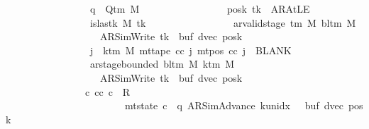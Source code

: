 \begin{isabellebody}
\ \ \ \ \ \ \ \ \ \ \ \ \ \ \ \ \ q\ {\isasymin}\ Q{\isacharunderscore}{\kern0pt}tm\ M{\isacharsemicolon}{\kern0pt}\isanewline
\ \ \ \ \ \ \ \ \ \ \ \ \ \ \ \ \ posk\ tk\ {\isacharequal}{\kern0pt}\ AR{\isacharunderscore}{\kern0pt}AtLE{\isacharsemicolon}{\kern0pt}\isanewline
\ \ \ \ \ \ \ \ \ \ \ \ \ \ \ \ \ is{\isacharunderscore}{\kern0pt}last{\isacharunderscore}{\kern0pt}k\ M\ tk{\isacharsemicolon}{\kern0pt}\isanewline
\ \ \ \ \ \ \ \ \ \ \ \ \ \ \ \ \ ar{\isacharunderscore}{\kern0pt}valid{\isacharunderscore}{\kern0pt}stage\ {\isacharparenleft}{\kern0pt}{\isasymGamma}{\isacharunderscore}{\kern0pt}tm\ M{\isacharparenright}{\kern0pt}\ {\isacharparenleft}{\kern0pt}bl{\isacharunderscore}{\kern0pt}tm\ M{\isacharparenright}{\kern0pt}\isanewline
\ \ \ \ \ \ \ \ \ \ \ \ \ \ \ \ \ \ \ {\isacharparenleft}{\kern0pt}AR{\isacharunderscore}{\kern0pt}SimWrite{\isacharcomma}{\kern0pt}\ tk{\isacharcomma}{\kern0pt}\ {}{\isacharcomma}{\kern0pt}\ buf{\isacharcomma}{\kern0pt}\ dvec{\isacharcomma}{\kern0pt}\ posk{\isacharparenright}{\kern0pt}{\isacharsemicolon}{\kern0pt}\isanewline
\ \ \ \ \ \ \ \ \ \ \ \ \ \ \ \ \ {\isasymforall}j\ {\isasymge}\ k{\isacharunderscore}{\kern0pt}tm\ M{\isachardot}{\kern0pt}\ mt{\isacharunderscore}{\kern0pt}tape\ cc\ j\ {\isacharparenleft}{\kern0pt}mt{\isacharunderscore}{\kern0pt}pos\ cc\ j{\isacharparenright}{\kern0pt}\ {\isacharequal}{\kern0pt}\ BLANK{}{\isacharsemicolon}{\kern0pt}\isanewline
\ \ \ \ \ \ \ \ \ \ \ \ \ \ \ \ \ ar{\isacharunderscore}{\kern0pt}stage{\isacharunderscore}{\kern0pt}bounded\ {\isacharparenleft}{\kern0pt}bl{\isacharunderscore}{\kern0pt}tm\ M{\isacharparenright}{\kern0pt}\ {\isacharparenleft}{\kern0pt}k{\isacharunderscore}{\kern0pt}tm\ M{\isacharparenright}{\kern0pt}\isanewline
\ \ \ \ \ \ \ \ \ \ \ \ \ \ \ \ \ \ \ {\isacharparenleft}{\kern0pt}AR{\isacharunderscore}{\kern0pt}SimWrite{\isacharcomma}{\kern0pt}\ tk{\isacharcomma}{\kern0pt}\ {}{\isacharcomma}{\kern0pt}\ buf{\isacharcomma}{\kern0pt}\ dvec{\isacharcomma}{\kern0pt}\ posk{\isacharparenright}{\kern0pt}\ {\isasymrbrakk}\isanewline
\ \ \ \ \ \ \ \ \ \ \ \ \ \ \ {\isasymLongrightarrow}\ {\isasymexists}c{\isacharprime}{\kern0pt}{\isacharprime}{\kern0pt}{\isachardot}{\kern0pt}\ {\isacharparenleft}{\kern0pt}cc{\isacharcomma}{\kern0pt}\ c{\isacharprime}{\kern0pt}{\isacharprime}{\kern0pt}{\isacharparenright}{\kern0pt}\ {\isasymin}\ R{\isacharprime}{\kern0pt}\isanewline
\ \ \ \ \ \ \ \ \ \ \ \ \ \ \ \ \ \ \ \ \ \ \ {\isasymand}\ mt{\isacharunderscore}{\kern0pt}state\ c{\isacharprime}{\kern0pt}{\isacharprime}{\kern0pt}\ {\isacharequal}{\kern0pt}\ {\isacharparenleft}{\kern0pt}q{\isacharcomma}{\kern0pt}\ AR{\isacharunderscore}{\kern0pt}SimAdvance{\isacharcomma}{\kern0pt}\ k{\isacharunderscore}{\kern0pt}unidx\ {}{\isacharcomma}{\kern0pt}\ {}{\isacharcomma}{\kern0pt}\ buf{\isacharcomma}{\kern0pt}\ dvec{\isacharcomma}{\kern0pt}\ posk{\isacharparenright}{\kern0pt}\isanewline

\end{isabellebody}
